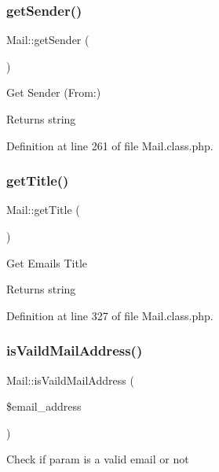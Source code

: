 \subsubsection{\texorpdfstring{get\+Sender()}{getSender()}}
{\footnotesize\ttfamily Mail\+::get\+Sender (\begin{DoxyParamCaption}{ }\end{DoxyParamCaption})}

Get Sender (From\+:)

\begin{DoxyReturn}{Returns}
string 
\end{DoxyReturn}


Definition at line 261 of file Mail.\+class.\+php.

\mbox{\label{classMail_aa03664254d34901e8545fa3725224e92}} 
\subsubsection{\texorpdfstring{get\+Title()}{getTitle()}}
{\footnotesize\ttfamily Mail\+::get\+Title (\begin{DoxyParamCaption}{ }\end{DoxyParamCaption})}

Get Email\textquotesingle{}s Title

\begin{DoxyReturn}{Returns}
string 
\end{DoxyReturn}


Definition at line 327 of file Mail.\+class.\+php.

\mbox{\label{classMail_a2d7fd899ae79dc18e7804a044127dbac}} 
\subsubsection{\texorpdfstring{is\+Vaild\+Mail\+Address()}{isVaildMailAddress()}}
{\footnotesize\ttfamily Mail\+::is\+Vaild\+Mail\+Address (\begin{DoxyParamCaption}\item[{}]{\$email\+\_\+address }\end{DoxyParamCaption})}

Check if param is a valid email or not


